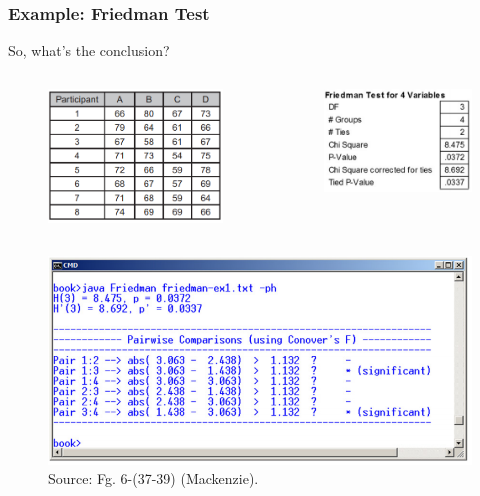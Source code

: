 \documentclass{beamer}
\begin{document}
\begin{frame}
	\frametitle{Example: Friedman Test} 
 	So, what's the conclusion?
	\begin{columns}[c] %
		
		\begin{figure}
			\includegraphics[width=0.65\linewidth]{6-37}
		\end{figure}
		
		\begin{figure}
			\includegraphics[width=0.75\linewidth]{6-38}
		\end{figure}
	\end{columns}
	\begin{figure}
		\includegraphics[width=0.4\linewidth]{6-39}
		\caption{Source: Fg. 6-(37-39) (Mackenzie).}
	\end{figure}
\end{frame}
\end{document}
